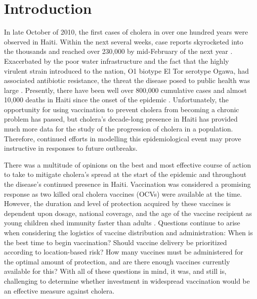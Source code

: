 \documentclass[12pt]{article}
\begin{document}

\section{Introduction}

 In late October of 2010, the first cases of cholera in over one hundred years were observed in Haiti. Within the next several weeks, case reports skyrocketed into the thousands and reached over 230,000 by mid-February of the next year \cite{zaro, chao}. Exacerbated by the poor water infrastructure and the fact that the highly virulent strain introduced to the nation, O1 biotype El Tor serotype Ogawa, had associated antibiotic resistance, the threat the disease posed to public health was large \cite{zaro}. Presently, there have been well over 800,000 cumulative cases and almost 10,000 deaths in Haiti since the onset of the epidemic \cite{Lee_haiticholera}. Unfortunately, the opportunity for using vaccination to prevent cholera from becoming a chronic problem has passed, but cholera's decade-long presence in Haiti has provided much more data for the study of the progression of cholera in a population. Therefore, continued efforts in modelling this epidemiological event may prove instructive in responses to future outbreaks.
  
  There was a multitude of opinions on the best and most effective course of action to take to mitigate cholera's spread at the start of the epidemic and throughout the disease's continued presence in Haiti. Vaccination was considered a promising response as two killed oral cholera vaccines (OCVs) were available at the time. However, the duration and level of protection acquired by these vaccines is dependent upon dosage, national coverage, and the age of the vaccine recipient as young children shed immunity faster than adults \cite{chao}. Questions continue to arise when considering the logistics of vaccine distribution and administration: When is the best time to begin vaccination? Should vaccine delivery be prioritized according to location-based risk? How many vaccines must be administered for the optimal amount of protection, and are there enough vaccines currently available for this? With all of these questions in mind, it was, and still is, challenging to determine whether investment in widespread vaccination would be an effective measure against cholera.
  
\end{document}
